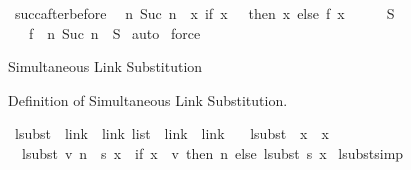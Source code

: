 \begin{isabellebody}
\isanewline
\isanewline
{}\isamarkupfalse%
\ succ{\isacharunderscore}{\kern0pt}after{\isacharunderscore}{\kern0pt}before{\isacharcolon}{\kern0pt}\isanewline
\ \ {\isachardoublequoteopen}{\isacharbraceleft}{\kern0pt}n{\isachardot}{\kern0pt}\ Suc\ n\ {\isasymin}\ {\isacharparenleft}{\kern0pt}{\isasymlambda}x{\isachardot}{\kern0pt}\ if\ x\ {\isacharequal}{\kern0pt}\ {}\ then\ x\ else\ {\isacharparenleft}{\kern0pt}f\ {\isacharparenleft}{\kern0pt}x\ {\isacharminus}{\kern0pt}\ {}{\isacharparenright}{\kern0pt}\ {\isacharplus}{\kern0pt}\ {}{\isacharparenright}{\kern0pt}{\isacharparenright}{\kern0pt}\ {\isacharbackquote}{\kern0pt}\ S{\isacharbraceright}{\kern0pt}\ {\isacharequal}{\kern0pt}\isanewline
\ \ \ f\ {\isacharbackquote}{\kern0pt}\ {\isacharbraceleft}{\kern0pt}n{\isachardot}{\kern0pt}\ Suc\ n\ {\isasymin}\ S{\isacharbraceright}{\kern0pt}{\isachardoublequoteclose}\isanewline
%
\isadelimproof
%
\endisadelimproof
%
\isatagproof
{}\isamarkupfalse%
\ auto\isanewline
{}\isamarkupfalse%
\ force%
\endisatagproof
{\isafoldproof}%
%
\isadelimproof
%
\endisadelimproof
%
\begin{isamarkuptext}%
Simultaneous Link Substitution%
\end{isamarkuptext}\isamarkuptrue%
%
\begin{isamarkuptext}%
Definition of Simultaneous Link Substitution.%
\end{isamarkuptext}\isamarkuptrue%
\isamarkupfalse%
\ lsubst\ {\isacharcolon}{\kern0pt}{\isacharcolon}{\kern0pt}\ {\isachardoublequoteopen}{\isacharparenleft}{\kern0pt}link\ {\isacharasterisk}{\kern0pt}\ link{\isacharparenright}{\kern0pt}\ list\ {\isacharequal}{\kern0pt}{\isachargreater}{\kern0pt}\ link\ {\isacharequal}{\kern0pt}{\isachargreater}{\kern0pt}\ link{\isachardoublequoteclose}\ \isanewline
\ \ {\isachardoublequoteopen}lsubst\ {\isacharbrackleft}{\kern0pt}{\isacharbrackright}{\kern0pt}\ x\ {\isacharequal}{\kern0pt}\ x{\isachardoublequoteclose}\ {\isacharbar}{\kern0pt}\isanewline
\ \ {\isachardoublequoteopen}lsubst\ {\isacharparenleft}{\kern0pt}{\isacharparenleft}{\kern0pt}v{\isacharcomma}{\kern0pt}\ n{\isacharparenright}{\kern0pt}\ {\isacharhash}{\kern0pt}\ s{\isacharparenright}{\kern0pt}\ x\ {\isacharequal}{\kern0pt}\ {\isacharparenleft}{\kern0pt}if\ x\ {\isacharequal}{\kern0pt}\ v\ then\ n\ else\ lsubst\ s\ x{\isacharparenright}{\kern0pt}{\isachardoublequoteclose}\isanewline
\isanewline
\isanewline
{}\isamarkupfalse%
\ lsubst{\isacharunderscore}{\kern0pt}simp{\isacharcolon}{\kern0pt}\isanewline

\end{isabellebody}
